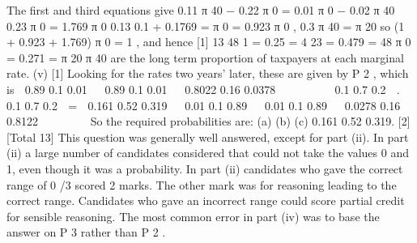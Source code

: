 The first and third equations give
0.11 π 40 − 0.22 π 0 = 0.01 π 0 − 0.02 π 40
0.23
π 0 = 1.769 π 0
0.13
0.1 + 0.1769
=
π 0 = 0.923 π 0 ,
0.3
π 40 =
π 20
so (1 + 0.923 + 1.769) π 0 = 1 , and hence
[1]
13
48
1
= 0.25 =
4
23
= 0.479 =
48
π 0 = 0.271 =
π 20
π 40
are the long term proportion of taxpayers at each marginal rate.
(v)
[1]
Looking for the rates two years’ later, these are given by P 2 , which is
 0.89 0.1 0.01   0.89 0.1 0.01   0.8022 0.16 0.0378 

 
 

 0.1 0.7 0.2  .  0.1 0.7 0.2  =  0.161 0.52 0.319 
 0.01 0.1 0.89   0.01 0.1 0.89   0.0278 0.16 0.8122 

 
 

So the required probabilities are:
(a)
(b)
(c)
0.161
0.52
0.319.
[2]
[Total 13]
This question was generally well answered, except for part (ii). In part (ii) a
large number of candidates considered that \beta could not take the values 0 and
1, even though it was a probability. In part (ii) candidates who gave the
correct range of 0 \leq \beta {}/3 scored 2 marks. The other mark was for
reasoning leading to the correct range. Candidates who gave an incorrect
range could score partial credit for sensible reasoning. The most common
error in part (iv) was to base the answer on P 3 rather than P 2 .
